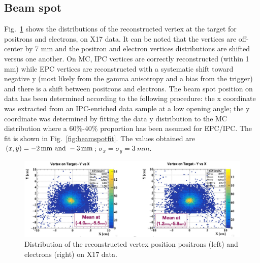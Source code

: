 \begin{refsection}
        \subsection{Beam spot}
        Fig.~\ref{fig:beamspot1} shows the distributions of the reconstructed vertex at the target for positrons and electrons, on X17 data. 
        It can be noted that the vertices are off-center by 7 mm and the positron and electron vertices distributions are shifted versus one another.
        On MC, IPC vertices are correctly reconstructed (within 1 mm) while EPC vertices are reconstructed with a systematic shift toward negative y (most likely from the gamma anisotropy and a bias from the trigger) and there is a shift between positrons and electrons.
        The beam spot position on data has been determined according to the following procedure: the x coordinate was extracted from an IPC-enriched data sample at a low opening angle; the y coordinate was determined by fitting the data y distribution to the MC distribution where a 60$\%$-40$\%$ proportion has been assumed for EPC/IPC. The fit is shown in Fig.~\ref{fig:beamspotfit}.
        The values obtained are $(x, y) = \SIlist{-2; -3}{mm}$; $\sigma_x= \sigma_y = \SI{3}{mm}$.

        \begin{figure}[]
            \centering
            \includegraphics[scale=0.5]{Figures/X17/Analysis/BeamSpotData.pdf}
            \caption{Distribution of the reconstructed vertex position positrons (left) and electrons (right) on X17 data.}
             \label{fig:beamspot1}
        \end{figure}
        

\end{refsection}
